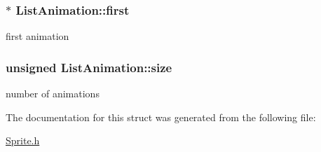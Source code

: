\subsubsection[{\texorpdfstring{first}{first}}]{$\ast$ List\+Animation\+::first}\hypertarget{structListAnimation_a10e6ec29763c73d4e86c6f2e826745a0}{}\label{structListAnimation_a10e6ec29763c73d4e86c6f2e826745a0}
first animation 
\subsubsection[{\texorpdfstring{size}{size}}]{\setlength{\rightskip}{0pt plus 5cm}unsigned List\+Animation\+::size}\hypertarget{structListAnimation_a445c07a71a57e1e9ff7312bea9e98f8e}{}\label{structListAnimation_a445c07a71a57e1e9ff7312bea9e98f8e}
number of animations 

The documentation for this struct was generated from the following file\+:\begin{DoxyCompactItemize}
\item 
\hyperlink{Sprite_8h}{Sprite.\+h}\end{DoxyCompactItemize}
